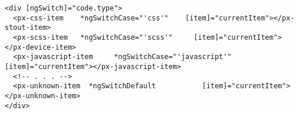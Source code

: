\begin{lstlisting}
<div [ngSwitch]="code.type">
  <px-css-item    *ngSwitchCase="'css'"    [item]="currentItem"></px-stout-item>
  <px-scss-item   *ngSwitchCase="'scss'"     [item]="currentItem"></px-device-item>
  <px-javascript-item     *ngSwitchCase="'javascript'"  [item]="currentItem"></px-javascript-item>
  <!-- . . . -->
  <px-unknown-item  *ngSwitchDefault           [item]="currentItem"></px-unknown-item>
</div>
\end{lstlisting}

